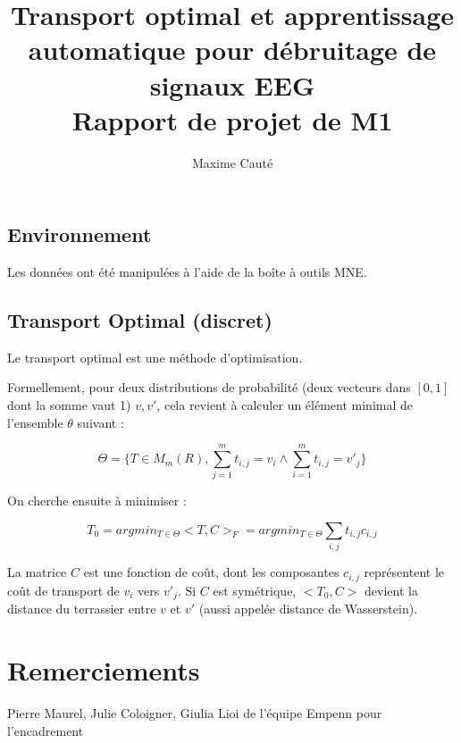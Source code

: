 \documentclass[a4paper]{article}
\begin{document}
\title{Transport optimal et apprentissage automatique pour débruitage de signaux EEG \\
			Rapport de projet de M1}
\author{Maxime Cauté}


\maketitle

\subsection{Environnement}

Les données ont été manipulées à l'aide de la boîte à outils MNE. %

\subsection{Transport Optimal (discret)}

Le transport optimal est une méthode d'optimisation.

Formellement, pour deux distributions de probabilité (deux vecteurs dans $[0,1]$ dont la somme vaut 1) $v, v'$, cela revient à calculer un élément minimal de l'ensemble $\theta$ suivant :

	$$ \Theta = \{ T \in M_m(R), \sum_{j=1}^m t_{i,j} = v_i \wedge \sum_{i=1}^m t_{i,j} = v'_j\}$$

On cherche ensuite à minimiser :

	$$ T_0 = argmin_{T \in \Theta} <T, C>_F = argmin_{T \in \Theta} \sum_{i,j} t_{i,j}c_{i,j} $$

La matrice $C$ est une fonction de coût, dont les composantes $c_{i,j}$ représentent le coût de transport de $v_i$ vers $v'_j$. Si $C$ est symétrique, $<T_0,C>$ devient la distance du terrassier entre $v$ et $v'$ (aussi appelée distance de Wasserstein).




\section*{Remerciements}

Pierre Maurel, Julie Coloigner, Giulia Lioi de l'équipe Empenn pour l'encadrement
\end{document}

